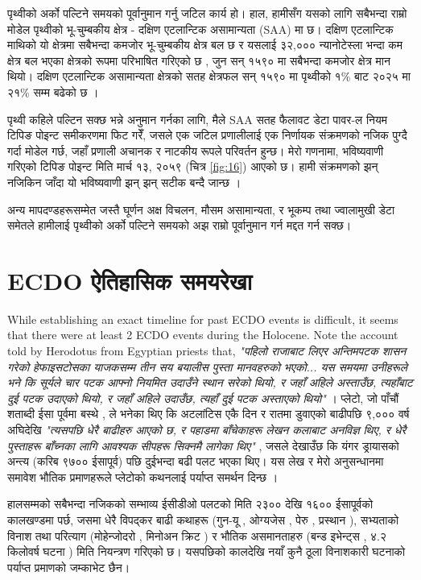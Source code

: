 \documentclass[10pt,twocolumn,letterpaper]{article}
\begin{document}
पृथ्वीको अर्को पल्टिने समयको पूर्वानुमान गर्नु जटिल कार्य हो। हाल, हामीसँग यसको लागि सबैभन्दा राम्रो मोडेल पृथ्वीको भू-चुम्बकीय क्षेत्र - दक्षिण एटलान्टिक असामान्यता (SAA) मा छ। दक्षिण एटलान्टिक माथिको यो क्षेत्रमा सबैभन्दा कमजोर भू-चुम्बकीय क्षेत्र बल छ र यसलाई ३२,००० न्यानोटेस्ला भन्दा कम क्षेत्र बल भएका क्षेत्रको रूपमा परिभाषित गरिएको छ \cite{135}, जुन सन् १५९० मा सबैभन्दा कमजोर क्षेत्र मान थियो। दक्षिण एटलान्टिक असामान्यता क्षेत्रको सतह क्षेत्रफल सन् १५९० मा पृथ्वीको १\% बाट २०२५ मा २१\% सम्म बढेको छ \cite{136}।

पृथ्वी कहिले पल्टिन सक्छ भन्ने अनुमान गर्नका लागि, मैले SAA सतह फैलावट डेटा पावर-ल नियम टिपिङ पोइन्ट समीकरणमा फिट गरेँ, जसले एक जटिल प्रणालीलाई एक निर्णायक संक्रमणको नजिक पुग्दै गर्दा मोडेल गर्छ, जहाँ प्रणाली अचानक र नाटकीय रूपले परिवर्तन हुन्छ। मेरो गणनामा, भविष्यवाणी गरिएको टिपिङ पोइन्ट मिति मार्च १३, २०५९ (चित्र \ref{fig:16}) आएको छ। हामी संक्रमणको झन् नजिकिन जाँदा यो भविष्यवाणी झन् झन् सटीक बन्दै जान्छ \cite{136}।

अन्य मापदण्डहरूसम्मेत जस्तै घूर्णन अक्ष विचलन, मौसम असामान्यता, र भूकम्प तथा ज्वालामुखी डेटा समेतले हामीलाई पृथ्वीको अर्को पल्टिने समयको अझ राम्रो पूर्वानुमान गर्न मद्दत गर्न सक्छ।

\section{ECDO ऐतिहासिक समयरेखा}
While establishing an exact timeline for past ECDO events is difficult, it seems that there were at least 2 ECDO events during the Holocene. Note the account told by Herodotus from Egyptian priests that, \textit{"पहिलो राजाबाट लिएर अन्तिमपटक शासन गरेको हेफाइसटोसका याजकसम्म तीन सय बयालीस पुस्ता मानवहरुको भएको... यस समयमा उनीहरूले भने कि सूर्यले चार पटक आफ्नो नियमित उदाउँने स्थान सरेको थियो, र जहाँ अहिले अस्ताउँछ, त्यहाँबाट दुई पटक उदाएको थियो, र जहाँ अहिले उदाउँछ, त्यहाँ दुई पटक अस्ताएको थियो"} \cite{32}। प्लेटो, जो पाँचौं शताब्दी ईसा पूर्वमा बस्थे \cite{111}, ले भनेका थिए कि अटलांटिस एकै दिन र रातमा डुवाएको बाढीपछि ९,००० वर्ष अघिदेखि \textit{"त्यसपछि धेरै बाढीहरु आएको छ, र पहाडमा बाँचेकाहरू लेखन कलाबाट अनविज्ञ थिए, र धेरै पुस्ताहरू बाँच्नका लागि आवश्यक सीपहरू सिक्नमै लागेका थिए"} \cite{112}, जसले देखाउँछ कि यंगर ड्रायासको अन्त्य (करिब ९७०० ईसापूर्व) पछि दुईभन्दा बढी पलट भएका थिए। यस लेख र मेरो अनुसन्धानमा समावेश भौतिक प्रमाणहरूले प्लेटोको कथनलाई पर्याप्त समर्थन दिन्छ \cite{2}।

हालसम्मको सबैभन्दा नजिकको सम्भाव्य ईसीडीओ पलटको मिति २३०० देखि १६०० ईसापूर्वको कालखण्डमा पर्छ, जसमा धेरै विपद्कर बाढी कथाहरू (गुन-यू \cite{113,114,115}, ओग्यजेस \cite{116,117}, पेरु \cite{118,119}, प्रस्थान \cite{120}), सभ्यताको विनाश तथा परित्याग (मोहेन्जोदरो \cite{121}, मिनोअन क्रिट \cite{100,101}) र भौतिक असमानताहरु (बन्ड इभेन्ट्स \cite{122}, ४.२ किलोवर्ष घटना \cite{90}) मिति नियन्त्रण गरिएको छ। यसपछिको कालदेखि नयाँ कुनै ठूला विनाशकारी घटनाको पर्याप्त प्रमाणको जम्काभेट छैन।
\end{document}
